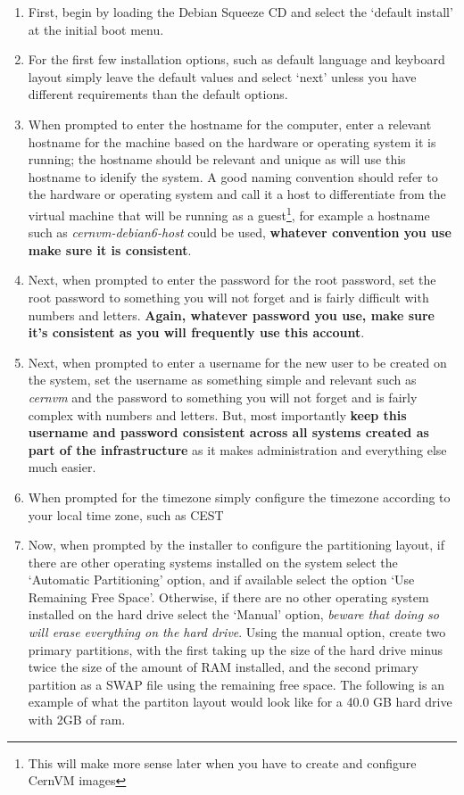 \begin{enumerate}
\item First, begin by loading the Debian Squeeze CD and select the `default install' at the initial boot menu.

\item For the first few installation options, such as default language and keyboard layout simply leave the default values and select
`next' unless you have different requirements than the default options.

\item When prompted to enter the hostname for the computer, enter a relevant hostname for the machine based on the hardware or operating
system it is running; the hostname should be relevant and unique as \tapper will use this hostname to idenify the system. A good naming
convention should refer to the hardware or operating system and call it a host to differentiate from the virtual machine that will be
running as a guest\footnote{This will make more sense later when you have to create and configure CernVM images}, for example a hostname such
as \emph{cernvm-debian6-host} could be used, {\bf whatever convention you use make sure it is consistent}.

\item	Next, when prompted to enter the password for the root password, set the root password to something you will not forget and is fairly
		difficult with numbers and letters. {\bf Again, whatever password you use,  make sure it's consistent as you will frequently
		use this account}.

\item Next, when prompted to enter a username for the new user to be created on the system, set the username as something simple and relevant
such as \emph{cernvm} and the password to something you will not forget and is fairly complex with numbers and letters. But, most importantly 
{\bf keep this username and password consistent across all systems created as part of the infrastructure} as it makes administration and everything
else much easier.

\item When prompted for the timezone simply configure the timezone according to your local time zone, such as CEST

\item Now, when prompted by the installer to configure the partitioning layout, if there are other operating systems installed on the system 
select the `Automatic Partitioning' option, and if available select the option `Use Remaining Free Space'. Otherwise, if there are no other 
operating system installed on the hard drive select the `Manual' option, \emph{beware that doing so will erase everything on the hard drive}.
Using the manual option, create two primary partitions, with the first taking up the size of the hard drive minus twice the size of the amount
of RAM installed, and the second primary partition as a SWAP file using the remaining free space. The following is an example of what the partiton
layout would look like for a 40.0 GB hard drive with 2GB of ram.


\end{enumerate}
